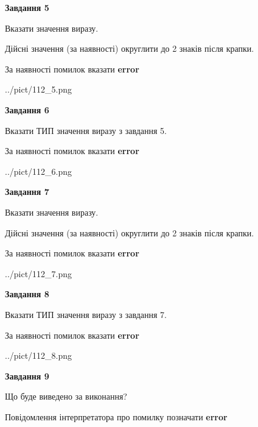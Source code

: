 \documentclass[11pt, ukrainian]{article}
\begin{document}
{\begin {large}
{\begin {center}\textbf{Завдання 5}\end {center}}\par
Вказати значення виразу. \par
Дійсні значення (за наявності) округлити до 2 знаків після крапки. \par
За наявності помилок вказати \textbf{error}

\begin{center}
	{../pict/112_5.png}
\end{center}
\newpage

{\begin {center}\textbf{Завдання 6}\end {center}}\par
Вказати ТИП значення виразу з завдання 5. \par
За наявності помилок вказати \textbf{error}

\begin{center}
	{../pict/112_6.png}
\end{center}
\newpage

{\begin {center}\textbf{Завдання 7}\end {center}}\par
Вказати значення виразу. \par
Дійсні значення (за наявності) округлити до 2 знаків після крапки. \par
За наявності помилок вказати \textbf{error}

\begin{center}
	{../pict/112_7.png}
\end{center}
\newpage

{\begin {center}\textbf{Завдання 8}\end {center}}\par
Вказати ТИП значення виразу з завдання 7. \par
За наявності помилок вказати \textbf{error}

\begin{center}
	{../pict/112_8.png}
\end{center}
\newpage

{\begin {center}\textbf{Завдання 9}\end {center}}\par
Що буде виведено за виконання? \par
Повідомлення інтерпретатора про помилку позначати \textbf{error}


\end{large}}
\end{document}
